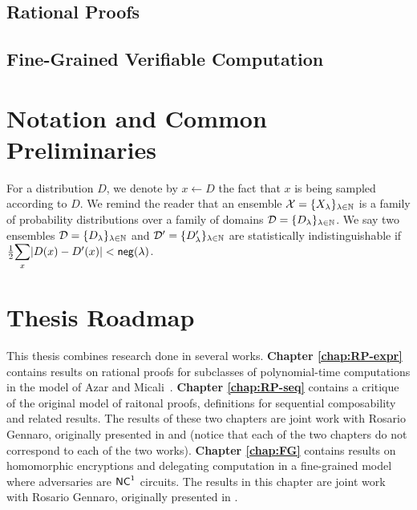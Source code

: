 \subsection{Rational Proofs}




\subsection{Fine-Grained Verifiable Computation}



\section{Notation and Common Preliminaries}

For a distribution $D$, we denote by $x \gets D$ the fact that $x$ is being sampled according to $D$.
We remind the reader that an ensemble $\mathcal{X} = \{X_{\lambda}\}_{\lambda\in\mathbb{N}}$ is a family of  probability distributions over a family of domains $\mathcal{D}=\{D_{\lambda}\}_{\lambda\in\mathbb{N}}$. We say two ensembles $\mathcal{D} = \{D_{\lambda}\}_{\lambda\in\mathbb{N}}$ and $\mathcal{D}' = \{D'_{\lambda}\}_{\lambda\in\mathbb{N}}$ are statistically indistinguishable if $\frac{1}{2}\Sum_x |D(x)-D'(x)| < \negl(\lambda)$. 


\section{Thesis Roadmap} 
This thesis combines research done in several works.
\textbf{Chapter \ref{chap:RP-expr}} contains results on rational proofs for subclasses of polynomial-time computations in the model of Azar and Micali~\cite{am}. 
\textbf{Chapter \ref{chap:RP-seq}} contains a critique of the original model of raitonal proofs, definitions for sequential composability and related results. The results of these two chapters are joint work with Rosario Gennaro, originally presented in \cite{cg15} and \cite{cg17} (notice that each of the two chapters do not correspond to each of the two works).
\textbf{Chapter \ref{chap:FG}} contains results on homomorphic encryptions and delegating computation in a fine-grained model where adversaries are ${\mathsf{NC}}^1$ circuits.
 The results in this chapter are joint work with Rosario Gennaro, originally presented in \cite{cg18}.


